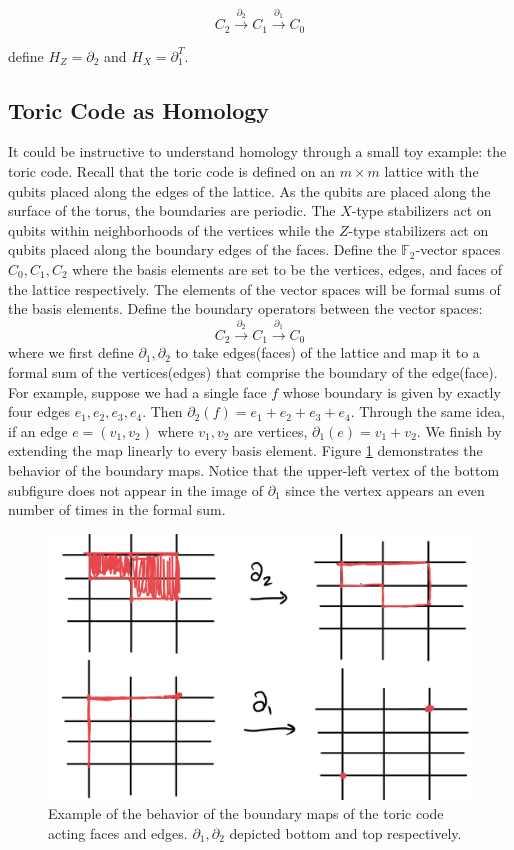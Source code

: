 \documentclass[12pt]{article}%
\theoremstyle{definition}
\begin{document}
\[ C_2 \xrightarrow{\partial_2} C_1 \xrightarrow{\partial_1} C_0 \]

\noindent define $H_Z = \partial_2$ and $H_X = \partial_1^T$. 


\subsection{Toric Code as Homology}
It could be instructive to understand homology through a small toy example: the toric code. Recall that the toric code is defined on an $m \times m$ lattice with the qubits placed along the edges of the lattice. As the qubits are placed along the surface of the torus, the boundaries are periodic. The $X$-type stabilizers act on qubits within neighborhoods of the vertices while the $Z$-type stabilizers act on qubits placed along the boundary edges of the faces. Define the $\mathbb{F}_2$-vector spaces $C_0,C_1,C_2$ where the basis elements are set to be the vertices, edges, and faces of the lattice respectively. The elements of the vector spaces will be formal sums of the basis elements.
%
Define the boundary operators between the vector spaces:
\[ C_2 \xrightarrow{\partial_2} C_1 \xrightarrow{\partial_1} C_0 \]
%
where we first define $\partial_1, \partial_2$ to take edges(faces) of the lattice and map it to a formal sum of the vertices(edges) that comprise the boundary of the edge(face). For example, suppose we had a single face $f$ whose boundary is given by exactly four edges $e_1, e_2, e_3, e_4$. Then $\partial_2(f) = e_1 + e_2 + e_3 + e_4$. Through the same idea, if an edge $e = (v_1,v_2)$ where $v_1,v_2$ are vertices, $\partial_1(e) = v_1 + v_2$. We finish by extending the map linearly to every basis element. Figure \ref{toricfig} demonstrates the behavior of the boundary maps. Notice that the upper-left vertex of the bottom subfigure does not appear in the image of $\partial_1$ since the vertex appears an even number of times in the formal sum.

\begin{figure} \label{toricfig}
 \centering
 \includegraphics[scale=0.15]{toric}
 \caption{Example of the behavior of the boundary maps of the toric code acting faces and edges. $\partial_1, \partial_2$ depicted bottom and top respectively.}
\end{figure}
\end{document}
